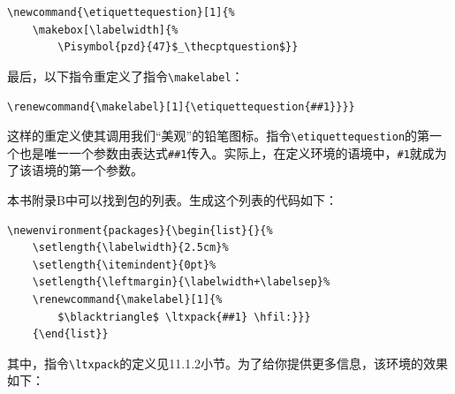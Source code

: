 \begin{dmd}
\begin{verbatim}
\newcommand{\etiquettequestion}[1]{% 
    \makebox[\labelwidth]{%
        \Pisymbol{pzd}{47}$_\thecptquestion$}}
\end{verbatim}
\end{dmd}

最后，以下指令重定义了指令\verb|\makelabel|：

\begin{dmd}
\verb|\renewcommand{\makelabel}[1]{\etiquettequestion{##1}}}}|
\end{dmd}

这样的重定义使其调用我们“美观”的铅笔图标。指令\verb|\etiquettequestion|的第一个也是唯一一个参数由表达式\verb+##1+传入。实际上，在定义环境的语境中，\verb|#1|就成为了该语境的第一个参数。

本书附录B中可以找到包的列表。生成这个列表的代码如下：

\begin{dmd}
\begin{verbatim}
\newenvironment{packages}{\begin{list}{}{%
    \setlength{\labelwidth}{2.5cm}%
    \setlength{\itemindent}{0pt}% 
    \setlength{\leftmargin}{\labelwidth+\labelsep}% 
    \renewcommand{\makelabel}[1]{%
        $\blacktriangle$ \ltxpack{##1} \hfil:}}}
    {\end{list}}
\end{verbatim}
\end{dmd}

\newenvironment{packages}{\begin{list}{}{%
    \setlength{\labelwidth}{2.5cm}%
    \setlength{\itemindent}{0pt}%
    \setlength{\leftmargin}{\labelwidth+\labelsep}%
    \renewcommand{\makelabel}[1]{%
        \textsf{##1} \hfil:}}}
    {\end{list}}

其中，指令\verb|\ltxpack|的定义见11.1.2小节。为了给你提供更多信息，该环境的效果如下：


